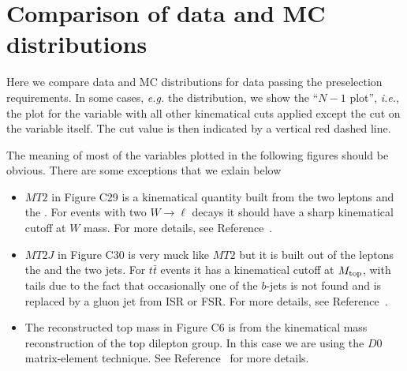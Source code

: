 \section{Comparison of data and MC distributions}
\label{sec:appendix}
Here we compare data and MC distributions for data passing the 
preselection requirements.  In some cases, {\em e.g.} the 
\met distribution, we show the ``$N-1$ plot'', {\em i.e.}, the 
plot for the variable with all other kinematical cuts
applied except the cut on the variable itself.  The
cut value is then indicated by a vertical red dashed line.

The meaning of most of the variables plotted in 
the following figures should be obvious.  There
are some exceptions that we exlain below

\begin{itemize}

\item $MT2$ in Figure C29 is a kinematical quantity 
built from the two leptons and the \met.  For events with
two $W \to \ell$ decays it should have a sharp kinematical cutoff
at $W$ mass.  For more details, see Reference~\cite{ref:MT2}.

\item $MT2J$ in Figure C30 is very muck like $MT2$ but it is built 
out of the leptons the \met and the two jets.  For $t\bar{t}$
events it has a kinematical cutoff at $M_{\rm top}$, with tails
due to the fact that occasionally one of the $b$-jets is not
found and is replaced by a gluon jet from ISR or FSR.
For more details, see Reference~\cite{ref:MT2J}.

\item The reconstructed top mass in Figure C6 is from the 
kinematical mass reconstruction of the top dilepton group.
In this case we are using the $D0$ matrix-element technique.
See Reference~\cite{ref:brown} for more details.

\end{itemize}


\clearpage

%
%

%
